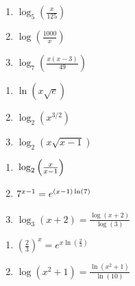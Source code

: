 \begin{multicols}{3}
\begin{enumerate}
\setcounter{enumi}{\value{HW}}

\item $\log_{5}\left(\frac{x}{125}\right)$
\item $\log\left(\frac{1000}{x}\right)$
\item $\log_{7}\left(\frac{x(x - 3)}{49}\right)$

\setcounter{HW}{\value{enumi}}
\end{enumerate}
\end{multicols}

\begin{multicols}{3}
\begin{enumerate}
\setcounter{enumi}{\value{HW}}

\item $\ln \left(x \sqrt{e} \right)$
\item $\log_{2}\left(x^{3/2}\right)$
\item $\log_{2}\left(x \sqrt{x-1}\right)$


\setcounter{HW}{\value{enumi}}
\end{enumerate}
\end{multicols}


\begin{multicols}{3}
\begin{enumerate}
\setcounter{enumi}{\value{HW}}
\item $\vphantom{\frac{\log(x + 2)}{\log(3)}}\log_{2}\left(\frac{x}{x - 1}\right)$ 
\item $\vphantom{\frac{\log(x + 2)}{\log(3)}}7^{x - 1} = e^{(x - 1)\ln(7)}$
\item $\log_{3}(x + 2) = \frac{\log(x + 2)}{\log(3)}$


\setcounter{HW}{\value{enumi}}
\end{enumerate}
\end{multicols}


\begin{multicols}{2}
\begin{enumerate}
\setcounter{enumi}{\value{HW}}

\item $\left(\frac{2}{3}\right)^{x} = e^{x\ln(\frac{2}{3})}$
\item $\log(x^{2} + 1) = \frac{\ln(x^{2} + 1)}{\ln(10)}$

\setcounter{HW}{\value{enumi}}
\end{enumerate}
\end{multicols}

